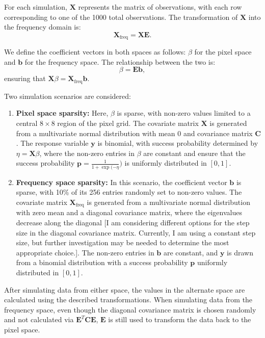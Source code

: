 \documentclass[12pt]{article}
\begin{document}
For each simulation, \( \mathbf{X} \) represents the matrix of observations, with each row corresponding to one of the 1000 total observations. The transformation of \( \mathbf{X} \) into the frequency domain is:
\[
\mathbf{X}_{\mathrm{freq}} = \mathbf{X} \mathbf{E}.
\]

We define the coefficient vectors in both spaces as follows: \( \beta \) for the pixel space and \( \mathbf{b} \) for the frequency space. The relationship between the two is:
\[
\beta = \mathbf{E} \mathbf{b},
\]
ensuring that \( \mathbf{X} \beta = \mathbf{X}_{\mathrm{freq}} \mathbf{b} \).

Two simulation scenarios are considered:
\begin{enumerate}
  \item \textbf{Pixel space sparsity:} Here, \( \beta \) is sparse, with non-zero values limited to a central \( 8 \times 8 \) region of the pixel grid. The covariate matrix \( \mathbf{X} \) is generated from a multivariate normal distribution with mean 0 and covariance matrix \( \mathbf{C} \). The response variable \( \mathbf{y} \) is binomial, with success probability determined by \( \eta = \mathbf{X} \beta \), where the non-zero entries in \( \beta \) are constant and ensure that the success probability \( \mathbf{p} = \frac{1}{1 + \exp(-\eta}) \) is uniformly distributed in \( [0, 1] \).
  
  \item \textbf{Frequency space sparsity:} In this scenario, the coefficient vector \( \mathbf{b} \) is sparse, with 10\% of its 256 entries randomly set to non-zero values. The covariate matrix \( \mathbf{X}_{\mathrm{freq}} \) is generated from a multivariate normal distribution with zero mean and a diagonal covariance matrix, where the eigenvalues decrease along the diagonal [I am considering different options for the step size in the diagonal covariance matrix. Currently, I am using a constant step size, but further investigation may be needed to determine the most appropriate choice.]. The non-zero entries in \( \mathbf{b} \) are constant, and \( \mathbf{y} \) is drawn from a binomial distribution with a success probability \( \mathbf{p} \) uniformly distributed in \( [0, 1] \).

\end{enumerate}

After simulating data from either space, the values in the alternate space are calculated using the described transformations. When simulating data from the frequency space, even though the diagonal covariance matrix is chosen randomly and not calculated via \( \mathbf{E}^T \mathbf{C} \mathbf{E} \), \( \mathbf{E} \) is still used to transform the data back to the pixel space.
\end{document}
